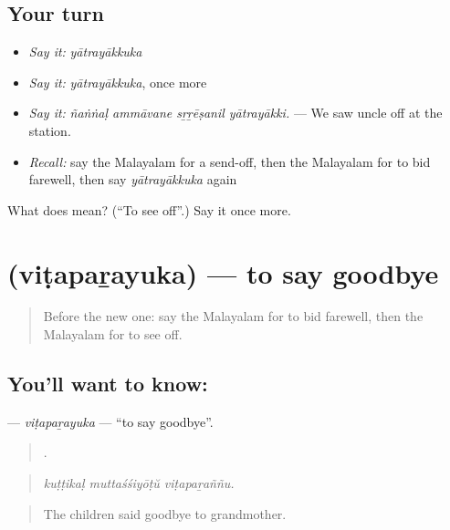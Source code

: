 \subsection*{Your turn}
\begin{itemize}
\raggedright
  \item \emph{Say it:} \emph{yātrayākkuka}
  \item \emph{Say it:} \emph{yātrayākkuka}, once more
  \item \emph{Say it:} \emph{ñaṅṅaḷ ammāvane sṟṟēṣanil yātrayākki.} — We saw uncle off at the station.
  \item \emph{Recall:} say the Malayalam for a send-off, then the Malayalam for to bid farewell, then say \emph{yātrayākkuka} again
\end{itemize}

\begin{tcolorbox}[breakable,colback=teal!4,colframe=teal!35!black,title={Before you move on}]
What does  mean? (\textquotedblleft{}To see off\textquotedblright{}.) Say it once more.
\end{tcolorbox}
\section[\texorpdfstring{\ml{വിടപറയുക} (viṭapaṟayuka)}{വിടപറയുക (viṭapaṟayuka)}]{ (viṭapaṟayuka) — to say goodbye}

\label{lesson:ML-C390-vitaparayuka}



\begin{quote}
Before the new one: say the Malayalam for to bid farewell, then the Malayalam for to see off.
\end{quote}

\subsection*{You'll want to know: }
\textbf{} — \emph{viṭapaṟayuka} — \textquotedblleft{}to say goodbye\textquotedblright{}.

\begin{quote}
  .
\end{quote}

\begin{quote}
\emph{kuṭṭikaḷ muttaśśiyōṭŭ viṭapaṟaññu.}
\end{quote}

\begin{quote}
The children said goodbye to grandmother.
\end{quote}

